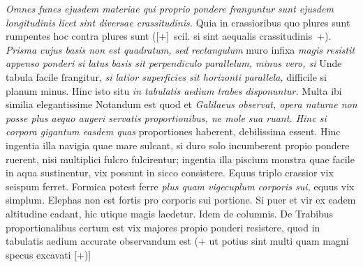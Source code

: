 \pend 
\pstart 
\textit{Omnes funes ejusdem materiae qui proprio pondere franguntur sunt ejusdem longitudinis licet sint diversae crassitudinis\protect{}.} Quia in crassioribus quo plures sunt rumpentes hoc contra plures sunt 
([+]~scil. si sint aequalis crassitudinis~+).  \,
\textit{Prisma\protect{} cujus basis non est quadratum\protect{}, sed rectangulum\protect{}} muro infixa \textit{magis resistit appenso ponderi si latus} 
 \textit{basis sit perpendiculo parallelum, minus vero, si } Unde tabula facile frangitur, \textit{si latior superficies sit horizonti parallela,} difficile si planum minus. Hinc isto situ
\textit{in tabulatis aedium trabes\protect{} disponuntur.} Multa ibi similia elegantissime  Notandum est quod et
\textit{Galilaeus\protect{}
observat, opera naturae non posse plus aequo augeri servatis
proportionibus, ne mole sua ruant.
Hinc si corpora gigantum easdem quas
}
proportiones haberent, debilissima essent. Hinc ingentia illa navigia\protect{} quae mare sulcant, si duro solo incumberent propio pondere ruerent, nisi multiplici fulcro fulcirentur; ingentia illa piscium monstra quae facile in aqua sustinentur, vix possunt in sicco consistere. Equus\protect{} triplo crassior vix seispum ferret. Formica\protect{} potest ferre \textit{plus quam vigecuplum corporis sui,} equus vix simplum. Elephas\protect{} non est fortis pro corporis sui portione. Si puer et vir ex eadem altitudine cadant, hic utique magis laedetur. Idem de columnis. De Trabibus proportionalibus certum est vix majores propio ponderi resistere, quod in tabulatis aedium accurate observandum est (+ ut potius sint multi quam magni specus excavati [+)]
